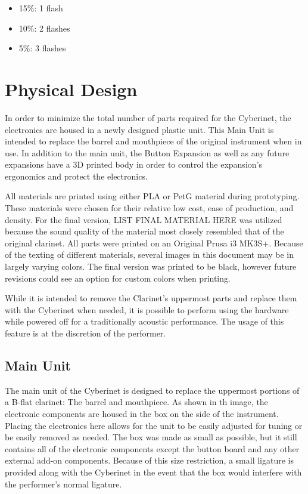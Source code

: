 \begin{itemize}
    \item 15\%: 1 flash
    \item 10\%: 2 flashes
    \item 5\%: 3 flashes
\end{itemize}


\chapter{Physical Design}
In order to minimize the total number of parts required for the Cyberinet, the electronics are housed in a newly designed plastic unit. This Main Unit is intended to replace the barrel and mouthpiece of the original instrument when in use. In addition to the main unit, the Button Expansion as well as any future expansions have a 3D printed body in order to control the expansion's ergonomics and protect the electronics.

All materials are printed using either PLA or PetG material during prototyping. These materials were chosen for their relative low cost, ease of production, and density. For the final version, LIST FINAL MATERIAL HERE was utilized because the sound quality of the material most closely resembled that of the original clarinet. All parts were printed on an Original Prusa i3 MK3S+. Because of the texting of different materials, several images in this document may be in largely varying colors. The final version was printed to be black, however future revisions could see an option for custom colors when printing. 

While it is intended to remove the Clarinet's uppermost parts and replace them with the Cyberinet when needed, it is possible to perform using the hardware while powered off for a traditionally acoustic performance. The usage of this feature is at the discretion of the performer.

\section{Main Unit}

The main unit of the Cyberinet is designed to replace the uppermost portions of a B-flat clarinet: The barrel and mouthpiece. As shown in th image, the electronic components are housed in the box on the side of the instrument. Placing the electronics here allows for the unit to be easily adjusted for tuning or be easily removed as needed. The box was made as small as possible, but it still contains all of the electronic components except the button board and any other external add-on components. Because of this size restriction, a small ligature is provided along with the Cyberinet in the event that the box would interfere with the performer's normal ligature.

